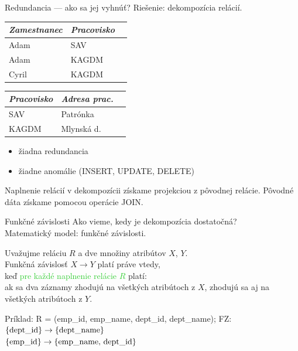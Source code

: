 \documentclass[12pt]{beamer}
\def\blue#1{\textcolor{Cerulean}{#1}}
\def\green#1{\textcolor{LimeGreen}{#1}}
\begin{document}
\begin{frame}[fragile]{Redundancia --- ako sa jej vyhnúť?}
Riešenie: dekompozícia relácií.

\bigskip
\begin{tabular}{|l|l|l|}
\hline
\emph{Zamestnanec} & \emph{Pracovisko} \\\hline
Adam & SAV \\\hline
Adam & KAGDM \\\hline
Cyril & KAGDM \\\hline
\end{tabular}
\begin{tabular}{|l|l|l|}
\hline
\emph{Pracovisko} & \emph{Adresa prac.} \\\hline
SAV & Patrónka \\\hline
KAGDM & Mlynská d. \\\hline
\end{tabular}
\bigskip

\begin{itemize}
\item žiadna redundancia
\item žiadne anomálie (INSERT, UPDATE, DELETE)
\end{itemize}

\bigskip
Naplnenie relácií v dekompozícii získame projekciou z pôvodnej relácie.
Pôvodné dáta získame pomocou operácie JOIN.
\end{frame}

\let\fz\rightarrow

\begin{frame}[fragile]{Funkčné závislosti}
Ako vieme, kedy je dekompozícia dostatočná?\\
Matematický model: funkčné závislosti.
\bigskip

Uvažujme reláciu $R$ a dve množiny atribútov $X$, $Y$.\\
\alert{Funkčná závislosť} $X\fz Y$ platí práve vtedy,\\
keď \green{pre každé naplnenie relácie $R$} platí:\\
\blue{ak sa dva záznamy zhodujú na všetkých atribútoch z $X$, zhodujú sa aj na všetkých atribútoch z $Y$}.
\bigskip

Príklad: R = (emp\_id, emp\_name, dept\_id, dept\_name); FZ:\\
$\{\hbox{dept\_id}\}\fz \{\hbox{dept\_name}\}$\\
$\{\hbox{emp\_id}\}\fz \{\hbox{emp\_name, dept\_id}\}$
\end{frame}
\end{document}
